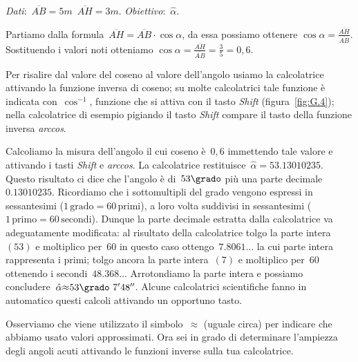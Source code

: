 \emph{Dati}:~$\overline{AB}=5\unit{m}$\quad~$\overline{AH}=3\unit{m}$. 
\qquad\emph{Obiettivo}:~$\hat{\alpha}$.

\begin{soluzione}
 Partiamo dalla formula~$\overline{AH}=\overline{AB}\cdot \cos \alpha$, da essa 
possiamo ottenere
$\cos \alpha=\frac{\overline{AH}}{\overline{AB}}$. Sostituendo i valori noti 
otteniamo
$\cos \alpha=\frac{\overline{AH}}{\overline{AB}}=\frac{3}{5}=0,6$.

Per risalire dal valore del coseno al valore dell'angolo usiamo la calcolatrice 
attivando la funzione inversa di coseno; su molte calcolatrici
tale funzione è indicata con~$\cos^{-1}$, funzione che si attiva con il tasto 
\emph{Shift} (figura~\ref{fig:G.4}); nella calcolatrice
di esempio pigiando il tasto \emph{Shift} compare il tasto della funzione 
inversa \emph{arccos}.

Calcoliamo la misura dell'angolo il cui coseno è~$0,6$ immettendo tale valore e 
attivando i tasti \emph{Shift} e \emph{arccos}.
La calcolatrice restituisce~${\hat{\alpha}}= 53.13010235$.
Questo risultato ci dice che l'angolo è di~$53\grado$ più una parte 
decimale~$0.13010235$.
Ricordiamo che i sottomultipli del grado vengono espressi in sessantesimi ($1\, 
\text{grado}=60\, \text{primi}$),
a loro volta suddivisi in sessantesimi ($1\, \text{primo}=60\, \text{secondi}$).
Dunque la parte decimale estratta dalla calcolatrice va adeguatamente 
modificata:
al risultato della calcolatrice tolgo la parte intera~$(53)$ e moltiplico 
per~$60$ in questo caso ottengo~$7.8061\ldots$ la cui parte
intera rappresenta i primi; tolgo ancora la parte intera~$(7)$ e moltiplico 
per~$60$ ottenendo i secondi~$48.368\ldots$
Arrotondiamo la parte intera e possiamo 
concludere~$\hat{\alpha}{\approx}53\grado~7'48''$.
Alcune calcolatrici scientifiche fanno in automatico questi calcoli attivando un 
opportuno tasto.

Osserviamo che viene utilizzato il simbolo~${\approx}$ (uguale circa) per 
indicare che abbiamo usato valori approssimati.
Ora sei in grado di determinare l'ampiezza degli angoli acuti attivando le 
funzioni inverse sulla tua calcolatrice.
\end{soluzione}

